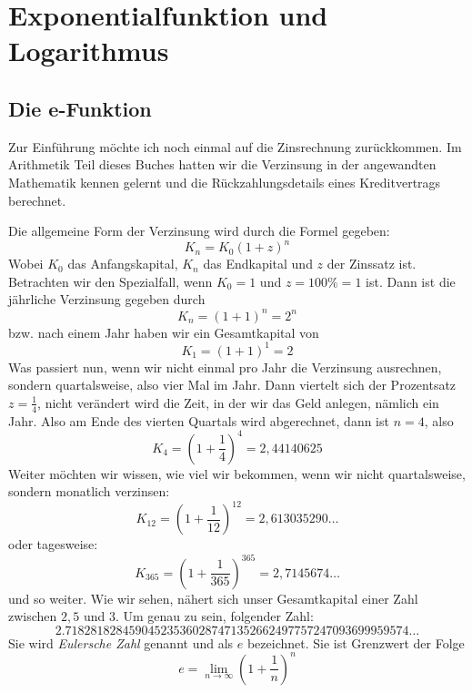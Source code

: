 
\chapter{Exponentialfunktion und Logarithmus}

\section{Die e-Funktion}

Zur Einführung möchte ich noch einmal auf die Zinsrechnung zurückkommen. Im Arithmetik Teil dieses Buches hatten wir die Verzinsung in der angewandten Mathematik kennen gelernt und die Rückzahlungsdetails eines Kreditvertrags berechnet. 

Die allgemeine Form der Verzinsung wird durch die Formel gegeben:
\begin{equation}
K_n = K_0 (1+z)^n
\end{equation}
Wobei $K_0$ das Anfangskapital, $K_n$ das Endkapital und $z$ der Zinssatz ist. Betrachten wir den Spezialfall, wenn $K_0 = 1$ und $z=100\% = 1$ ist. Dann ist die jährliche Verzinsung gegeben durch
\begin{equation}
K_n = (1+1)^n = 2^n
\end{equation}
bzw. nach einem Jahr haben wir ein Gesamtkapital von
\begin{equation}
K_1 = (1+1)^1 = 2
\end{equation}
Was passiert nun, wenn wir nicht einmal pro Jahr die Verzinsung ausrechnen, sondern quartalsweise, also vier Mal im Jahr. Dann viertelt sich der Prozentsatz $z=\frac{1}{4}$, nicht verändert wird die Zeit, in der wir das Geld anlegen, nämlich ein Jahr. Also am Ende des vierten Quartals wird abgerechnet, dann ist $n=4$, also
\begin{equation}
K_4 = \left(1+\frac{1}{4} \right)^4 = 2,44140625
\end{equation}
Weiter möchten wir wissen, wie viel wir bekommen, wenn wir nicht quartalsweise, sondern monatlich verzinsen:
\begin{equation}
K_{12} = \left(1+\frac{1}{12} \right)^{12} = 2,613035290\dots
\end{equation}
oder tagesweise:
\begin{equation}
K_{365} = \left(1+\frac{1}{365} \right)^{365} = 2,7145674\dots
\end{equation}
und so weiter. Wie wir sehen, nähert sich unser Gesamtkapital einer Zahl zwischen $2,5$ und $3$. Um genau zu sein, folgender Zahl:
\begin{equation}
2.718281828459045235360287471352662497757247093699959574\dots
\end{equation}
Sie wird \emph{Eulersche Zahl} genannt und als $e$ bezeichnet. Sie ist Grenzwert der Folge
\begin{equation}
e = \lim_{n\rightarrow \infty} \left( 1+\frac{1}{n} \right)^n
\end{equation}

